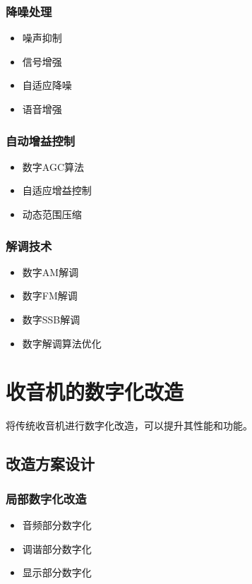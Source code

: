 \documentclass[12pt,UTF8]{ctexbook}
\begin{document}
\subsection{降噪处理}\begin{itemize}
  \item 噪声抑制
  \item 信号增强
  \item 自适应降噪
  \item 语音增强\end{itemize}

\subsection{自动增益控制}\begin{itemize}
  \item 数字AGC算法
  \item 自适应增益控制
  \item 动态范围压缩\end{itemize}

\subsection{解调技术}\begin{itemize}
  \item 数字AM解调
  \item 数字FM解调
  \item 数字SSB解调
  \item 数字解调算法优化\end{itemize}

\chapter{收音机的数字化改造}

将传统收音机进行数字化改造，可以提升其性能和功能。

\section{改造方案设计}

\subsection{局部数字化改造}\begin{itemize}
  \item 音频部分数字化
  \item 调谐部分数字化
  \item 显示部分数字化\end{itemize}
\end{document}
